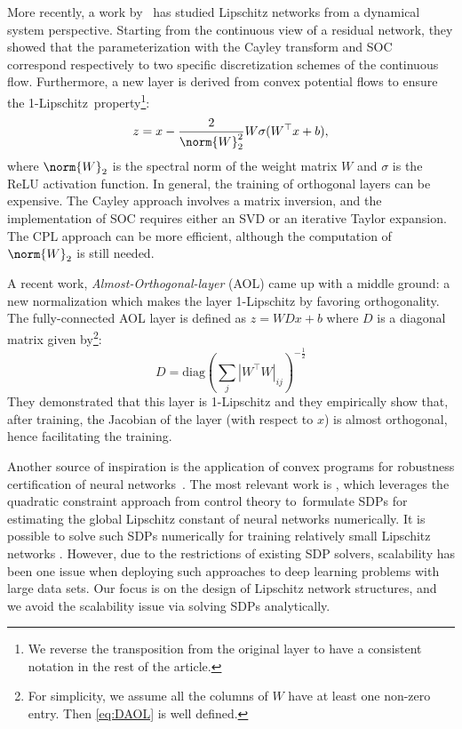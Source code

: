 \documentclass{article} \usepackage{iclr2023_conference,times}
\newcommand{\0}{\mathbf{0} }
\begin{document}
More recently, a work by~\cite{meunier2022dynamical} has studied Lipschitz networks from a dynamical system perspective. Starting from the continuous view of a residual network, they showed that the parameterization with the Cayley transform \citep{trockman2021orthogonalizing} and SOC \citep{skew2021sahil} correspond respectively to two specific discretization schemes of the continuous flow. 
Furthermore, a new layer is derived from convex potential flows to ensure the 1-Lipschitz~property\footnote{We reverse the transposition from the original layer to have a consistent notation in the rest of the article.}:
\begin{equation} \label{eq:cpl}
  z = x-\frac{2}{\norm{W}_2^2} W \sigma(W^\top x+b),
\end{equation}
where $\norm{W}_2$ is the spectral norm of the weight matrix $W$ and $\sigma$ is the ReLU activation function. In general, the training of orthogonal layers can be expensive. The Cayley approach involves a matrix inversion, and the implementation of SOC requires either an SVD or an iterative Taylor expansion. The CPL approach can be more efficient, although the computation of $\norm{W}_2$ is still needed.

A recent work, \textit{Almost-Orthogonal-layer} (AOL) \citep{prach2022almost} came up with a middle ground: a new normalization which makes the layer 1-Lipschitz by favoring orthogonality.  
The fully-connected AOL layer is defined as $z = W D x + b$ where $D$ is a diagonal matrix given by\footnote{For simplicity, we assume all the columns of $W$ have at least one non-zero entry. Then \eqref{eq:DAOL} is well defined.}:
\begin{equation}\label{eq:DAOL}
  D = \textstyle \mathrm{diag}\left( \sum_j | W^\top W |_{ij} \right)^{-\frac12}
\end{equation}
They demonstrated that this layer is 1-Lipschitz and they empirically show that, after training, the Jacobian of the layer (with respect to $x$) is almost orthogonal, hence facilitating the training.

Another source of inspiration is the application of convex programs for robustness certification of neural networks~\citep{wong2018provable,raghunathan2018semidefinite,fazlyab2019efficient,revay2020lipschitz,fazlyab2020safety,wang2022}.
The most relevant work is 
 \cite{fazlyab2019efficient}, which leverages the quadratic constraint approach from control theory \citep{Megretski1997} to~formulate SDPs for estimating  the global Lipschitz constant of neural networks numerically.  It is possible to solve such SDPs numerically for training relatively small Lipschitz networks \citep{pauli2021training}.
However, due to the restrictions of existing SDP solvers, scalability has been one issue when deploying such approaches to deep learning problems with large data sets. 
Our focus is on the design of Lipschitz network structures, and we avoid the scalability issue via solving SDPs analytically.
\end{document}
